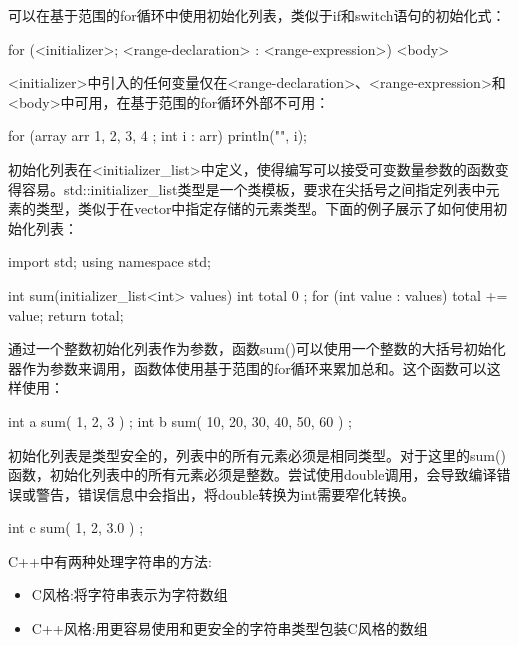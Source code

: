 
可以在基于范围的for循环中使用初始化列表，类似于if和switch语句的初始化式：

\begin{cpp}
for (<initializer>; <range-declaration> : <range-expression>) { <body> }
\end{cpp}

<initializer>中引入的任何变量仅在<range-declaration>、<range-expression>和<body>中可用，在基于范围的for循环外部不可用：

\begin{cpp}
for (array arr { 1, 2, 3, 4 }; int i : arr) { println("{}", i); }
\end{cpp}


初始化列表在<initializer\_list>中定义，使得编写可以接受可变数量参数的函数变得容易。std::initializer\_list类型是一个类模板，要求在尖括号之间指定列表中元素的类型，类似于在vector中指定存储的元素类型。下面的例子展示了如何使用初始化列表：

\begin{cpp}
import std;
using namespace std;

int sum(initializer_list<int> values)
{
    int total { 0 };
    for (int value : values) {
        total += value;
    }
    return total;
}
\end{cpp}

通过一个整数初始化列表作为参数，函数sum()可以使用一个整数的大括号初始化器作为参数来调用，函数体使用基于范围的for循环来累加总和。这个函数可以这样使用：

\begin{cpp}
int a { sum({ 1, 2, 3 }) };
int b { sum({ 10, 20, 30, 40, 50, 60 }) };
\end{cpp}

初始化列表是类型安全的，列表中的所有元素必须是相同类型。对于这里的sum()函数，初始化列表中的所有元素必须是整数。尝试使用double调用，会导致编译错误或警告，错误信息中会指出，将double转换为int需要窄化转换。

\begin{cpp}
int c { sum({ 1, 2, 3.0 }) };
\end{cpp}


C++中有两种处理字符串的方法:

\begin{itemize}
\item
C风格:将字符串表示为字符数组

\item
C++风格:用更容易使用和更安全的字符串类型包装C风格的数组
\end{itemize}

